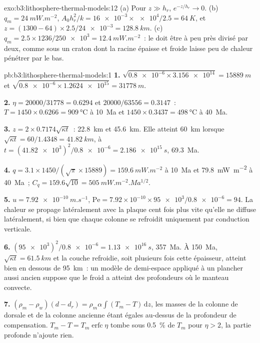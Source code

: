 \begin{solution}{exo:b3:lithosphere-thermal-models:12}
(a) Pour $z \gg h_r$, $e^{-z/h_r} \to 0$. (b) $q_m = \qty{24}{mW.m^{-2}}$,
$A_0h_r^2/k = \num{16e-3}\times\num{e4}/2.5 = \qty{64}{K}$, et $z = (1300 -
64)\times2.5/\num{24e-3} = \qty{128.8}{km}$. (c) $q_m = 2.5\times1236/\num{250e3}
= \qty{12.4}{mW.m^{-2}}$~: le  doit être à peu près divisé par deux, comme sous un
craton dont la racine épaisse et froide laisse peu de chaleur pénétrer par le bas.
\end{solution}

\begin{solution}{pb:b3:lithosphere-thermal-models:1}
\textbf{1.} $\sqrt{\num{0.8e-6}\times\num{3.156e14}} = \qty{15889}{m}$ et
$\sqrt{\num{0.8e-6}\times\num{1.2624e15}} = \qty{31778}{m}$.

\textbf{2.} $\eta = 20000/31778 = 0.6294$ et $20000/63556 = 0.3147$~:
$T = 1450\times0.6266 = \qty{909}{\celsius}$ à \qty{10}{Ma} et
$1450\times0.3437 = \qty{498}{\celsius}$ à \qty{40}{Ma}.

\textbf{3.} $z = 2\times0.7174\sqrt{\kappa t}$~: \qty{22.8}{km} et
\qty{45.6}{km}. Elle atteint \qty{60}{km} lorsque $\sqrt{\kappa t} = 60/1.4348 =
\qty{41.82}{km}$, à $t = (\num{41.82e3})^2/\num{0.8e-6} = \qty{2.186e15}{s}$,
\qty{69.3}{Ma}.

\textbf{4.} $q = 3.1\times1450/(\sqrt\pi\times15889) = \qty{159.6}{mW.m^{-2}}$ à
\qty{10}{Ma} et \qty{79.8}{mW.m^{-2}} à \qty{40}{Ma}~; $C_q = 159.6\sqrt{10}
= \qty{505}{mW.m^{-2}.Ma^{1/2}}$.

\textbf{5.} $u = \qty{7.92e-10}{m.s^{-1}}$, $\mathrm{Pe} = 7.92\times10^{-10}
\times\num{95e3}/\num{0.8e-6} = 94$. La chaleur se propage latéralement avec la plaque
cent fois plus vite qu'elle ne diffuse latéralement, si bien que chaque colonne
se refroidit uniquement par conduction verticale.

\textbf{6.} $(\num{95e3})^2/\num{0.8e-6} = \qty{1.13e16}{s}$, \qty{357}{Ma}.
À \qty{150}{Ma}, $\sqrt{\kappa t} = \qty{61.5}{km}$ et la couche refroidie, soit
plusieurs fois cette épaisseur, atteint bien en dessous de \qty{95}{km}~: un modèle de demi-espace appliqué à un plancher aussi ancien
suppose que le froid a atteint des profondeurs où le manteau convecte.

\textbf{7.} $(\rho_m - \rho_w)(d - d_r) = \rho_m\alpha\int(T_m - T)\,\mathrm dz$,
les masses de la colonne de dorsale et de la colonne ancienne étant égales au-dessus de
la profondeur de compensation. $T_m - T = T_m\operatorname{erfc}\eta$ tombe sous
\qty{0.5}{\percent} de $T_m$ pour $\eta > 2$, la partie profonde n'ajoute rien.


\end{solution}
